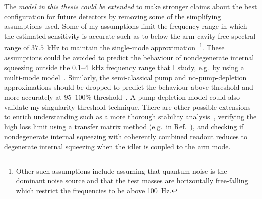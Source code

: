 The \emph{model in this thesis could be extended} to make stronger claims about the best configuration for future detectors by removing some of the simplifying assumptions used.
Some of my assumptions limit the frequency range in which the estimated sensitivity is accurate such as to below the arm cavity free spectral range of $37.5$~kHz to maintain the single-mode approximation~\footnote{Other such assumptions include assuming that quantum noise is the dominant noise source and that the test masses are horizontally free-falling which restrict the frequencies to be above 100~Hz.}. These assumptions could be avoided to predict the behaviour of nondegenerate internal squeezing outside the 0.1--4~kHz frequency range that I study, e.g.\ by using a multi-mode model~\cite{liEnhancingInterferometerSensitivity2021}.
Similarly, the semi-classical pump and no-pump-depletion approximations should be dropped to predict the behaviour above threshold and more accurately at 95--$100\%$ threshold~\cite{walls_1995}. A pump depletion model could also validate my singularity threshold technique. %
There are other possible extensions to enrich understanding such as a more thorough stability analysis~\cite{liEnhancingInterferometerSensitivity2021}, verifying the high loss limit using a transfer matrix method (e.g.\ in Ref.~\cite{korobkoQuantumExpanderGravitationalwave2019}), and checking if nondegenerate internal squeezing with coherently combined readout reduces to degenerate internal squeezing when the idler is coupled to the arm mode.

